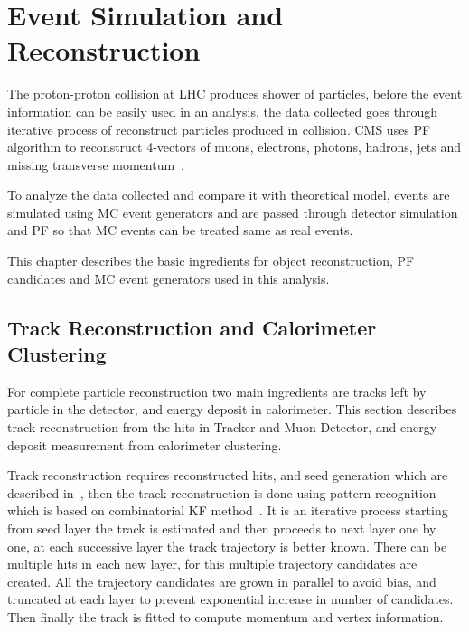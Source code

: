 \chapter{
  Event Simulation and Reconstruction
 }\label{ch_reco}

The proton-proton collision at \gls{LHC} produces shower of particles, before
the event information can be easily used in an analysis, the data collected goes
through iterative process of reconstruct particles produced in collision.
\gls{CMS} uses \gls{PF} algorithm to reconstruct 4-vectors of muons, electrons,
photons, hadrons, jets and missing transverse momentum~\cite{cms-particle-flow-2017}.

To analyze the data collected and compare it with theoretical model, events are
simulated using \gls{MC} event generators and are passed through detector simulation
and \gls{PF} so that \gls{MC} events can be treated same as real events.

This chapter describes the basic ingredients for object reconstruction, \gls{PF}
candidates and \gls{MC} event generators used in this analysis.

\section{
  Track Reconstruction and Calorimeter Clustering
 }\label{ch_reco:track-calo}

For complete particle reconstruction two main ingredients are tracks left by particle
in the detector, and energy deposit in calorimeter. This section describes track reconstruction
from the hits in Tracker and Muon Detector, and energy deposit measurement from
calorimeter clustering.

Track reconstruction requires reconstructed hits, and seed generation which are
described in~\cite{cms-track-vertex}, then the track reconstruction is done using
pattern recognition which is based on combinatorial \gls{KF} method~\cite{cms-track-reco}.
It is an iterative process starting from seed layer the track is estimated and then
proceeds to next layer one by one, at each successive layer the track trajectory
is better known. There can be multiple hits in each new layer, for this multiple
trajectory candidates are created. All the trajectory candidates are grown in parallel
to avoid bias, and truncated at each layer to prevent exponential increase
in number of candidates. Then finally the track is fitted to compute momentum
and vertex information.

